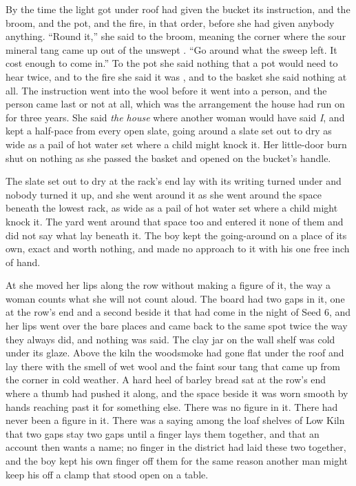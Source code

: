 By the time the light got under  roof  had given the bucket its instruction, and the broom, and the pot, and the fire, in that order, before she had given anybody anything. “Round it,” she said to the broom, meaning the corner where the sour mineral tang came up out of the unswept . “Go around what the sweep left. It cost enough to come in.” To the pot she said nothing that a pot would need to hear twice, and to the fire she said it was , and to the basket she said nothing at all. The instruction went into the wool before it went into a person, and the person came last or not at all, which was the arrangement the house had run on for three years. She said \emph{the house} where another woman would have said \emph{I}, and kept a half-pace from every open slate, going around a slate set out to dry as wide as a pail of hot water set where a child might knock it. Her little-door burn shut on nothing as she passed the basket and opened on the bucket's handle.

The slate set out to dry at the rack's end lay with its writing turned under and nobody turned it up, and she went around it as she went around the space beneath the lowest rack, as wide as a pail of hot water set where a child might knock it. The yard went around that space too and entered it none of them and did not say what lay beneath it. The boy kept the going-around on a place of its own, exact and worth nothing, and made no approach to it with his one free inch of hand.

At  she moved her lips along the row without making a figure of it, the way a woman counts what she will not count aloud. The board had two gaps in it, one at the row's end and a second beside it that had come in the night of Seed 6, and her lips went over the bare places and came back to the same spot twice the way they always did, and nothing was said. The clay jar on the wall shelf was cold under its glaze. Above the kiln the woodsmoke had gone flat under the roof and lay there with the smell of wet wool and the faint sour tang that came up from the corner in cold weather. A hard heel of barley bread sat at the row's end where a thumb had pushed it along, and the space beside it was worn smooth by hands reaching past it for something else. There was no figure in it. There had never been a figure in it. There was a saying among the loaf shelves of Low Kiln that two gaps stay two gaps until a finger lays them together, and that an account then wants a name; no finger in the district had laid these two together, and the boy kept his own finger off them for the same reason another man might keep his off a clamp that stood open on a table.

